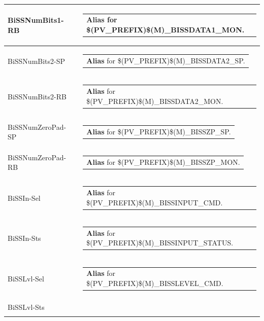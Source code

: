\documentclass[openany]{article}
\begin{document}
\begin{longtable}{| m{4.5cm} m{2.5cm}  m{8.0cm} |}
        BiSSNumBits1-RB &  & \begin{tabular}{@{}m{6cm}@{}}
                \textbf{Alias} for \$(PV\_PREFIX)\$(M)\_BISSDATA1\_MON.
            \end{tabular} \hypertarget{}{}\\ \hline
        BiSSNumBits2-SP &  & \begin{tabular}{@{}m{6cm}@{}}
                \textbf{Alias} for \$(PV\_PREFIX)\$(M)\_BISSDATA2\_SP.
            \end{tabular} \hypertarget{}{}\\ \hline
        BiSSNumBits2-RB &  & \begin{tabular}{@{}m{6cm}@{}}
                \textbf{Alias} for \$(PV\_PREFIX)\$(M)\_BISSDATA2\_MON.
            \end{tabular} \hypertarget{}{}\\ \hline
        BiSSNumZeroPad-SP &  & \begin{tabular}{@{}m{6cm}@{}}
                \textbf{Alias} for \$(PV\_PREFIX)\$(M)\_BISSZP\_SP.
            \end{tabular} \hypertarget{}{}\\ \hline
        BiSSNumZeroPad-RB &  & \begin{tabular}{@{}m{6cm}@{}}
                \textbf{Alias} for \$(PV\_PREFIX)\$(M)\_BISSZP\_MON.
            \end{tabular} \hypertarget{}{}\\ \hline
        BiSSIn-Sel &  & \begin{tabular}{@{}m{6cm}@{}}
                \textbf{Alias} for \$(PV\_PREFIX)\$(M)\_BISSINPUT\_CMD.
            \end{tabular} \hypertarget{}{}\\ \hline
        BiSSIn-Sts &  & \begin{tabular}{@{}m{6cm}@{}}
                \textbf{Alias} for \$(PV\_PREFIX)\$(M)\_BISSINPUT\_STATUS.
            \end{tabular} \hypertarget{}{}\\ \hline
        BiSSLvl-Sel &  & \begin{tabular}{@{}m{6cm}@{}}
                \textbf{Alias} for \$(PV\_PREFIX)\$(M)\_BISSLEVEL\_CMD.
            \end{tabular} \hypertarget{}{}\\ \hline
        BiSSLvl-Sts &  & \begin{tabular}{@{}m{6cm}@{}}

\end{tabular}
\end{longtable}
\end{document}
